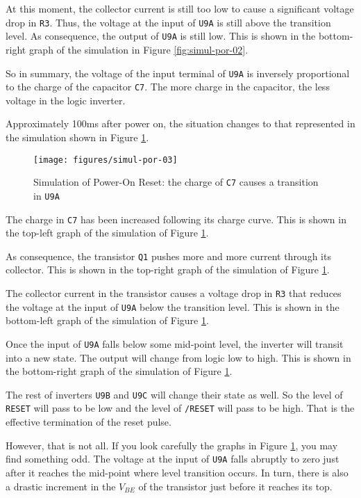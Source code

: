 At this moment, the collector current is still too low to cause a significant voltage drop in {\tt R3}. Thus, the voltage at the input of {\tt U9A} is still above the transition level. As consequence, the output of {\tt U9A} is still low. This is shown in the bottom-right graph of the simulation in Figure \ref{fig:simul-por-02}.

So in summary, the voltage of the input terminal of {\tt U9A} is inversely proportional to the charge of the capacitor {\tt C7}. The more charge in the capacitor, the less voltage in the logic inverter.

Approximately 100ms after power on, the situation changes to that represented in the simulation shown in Figure \ref{fig:simul-por-03}.

\begin{figure}[htb]
  \centering
  \texttt{[image: figures/simul-por-03]}
  \caption{Simulation of Power-On Reset: the charge of {\tt C7} causes a transition in {\tt U9A}}
  \label{fig:simul-por-03}
\end{figure}

The charge in {\tt C7} has been increased following its charge curve. This is shown in the top-left graph of the simulation of Figure \ref{fig:simul-por-03}.

As consequence, the transistor {\tt Q1} pushes more and more current through its collector. This is shown in the top-right graph of the simulation of Figure \ref{fig:simul-por-03}.

The collector current in the transistor causes a voltage drop in {\tt R3} that reduces the voltage at the input of {\tt U9A} below the transition level. This is shown in the bottom-left graph of the simulation of Figure \ref{fig:simul-por-03}.

Once the input of {\tt U9A} falls below some mid-point level, the inverter will transit into a new state. The output will change from logic low to high. This is shown in the bottom-right graph of the simulation of Figure \ref{fig:simul-por-03}.

The rest of inverters {\tt U9B} and {\tt U9C} will change their state as well. So the level of {\tt RESET} will pass to be low and the level of {\tt /RESET} will pass to be high. That is the effective termination of the reset pulse.

However, that is not all. If you look carefully the graphs in Figure \ref{fig:simul-por-03}, you may find something odd. The voltage at the input of {\tt U9A} falls abruptly to zero just after it reaches the mid-point where level transition occurs. In turn, there is also a drastic increment in the $V_{BE}$ of the transistor just before it reaches its top.

